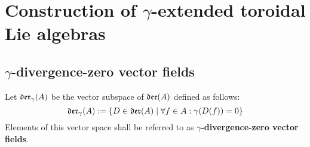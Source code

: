 \section{Construction of \texorpdfstring{$\gamma$}{}-extended toroidal Lie algebras}
    \subsection{\texorpdfstring{$\gamma$}{}-divergence-zero vector fields} \label{subsection: yangian_div_zero_vector_fields}
        \begin{definition} \label{def: yangian_div_zero_vector_fields}
            Let $\mathfrak{der}_{\gamma}(A)$ be the vector subspace of $\mathfrak{der}(A)$ defined as follows:
                $$\mathfrak{der}_{\gamma}(A) := \{ D \in \mathfrak{der}(A) \mid \forall f \in A: \gamma(D(f)) = 0 \}$$
            Elements of this vector space shall be referred to as \textbf{$\gamma$-divergence-zero vector fields}.
        \end{definition}
        \begin{remark}
        \end{remark}

